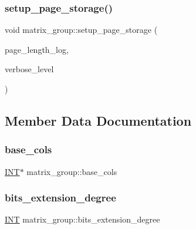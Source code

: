\subsubsection{\texorpdfstring{setup\+\_\+page\+\_\+storage()}{setup\_page\_storage()}}
{\footnotesize\ttfamily void matrix\+\_\+group\+::setup\+\_\+page\+\_\+storage (\begin{DoxyParamCaption}\item[{\mbox{\hyperlink{galois_8h_a09fddde158a3a20bd2dcadb609de11dc}{I\+NT}}}]{page\+\_\+length\+\_\+log,  }\item[{\mbox{\hyperlink{galois_8h_a09fddde158a3a20bd2dcadb609de11dc}{I\+NT}}}]{verbose\+\_\+level }\end{DoxyParamCaption})}



\subsection{Member Data Documentation}
\mbox{\label{classmatrix__group_a2b8d2ba90b5990ee7de25de2219f3097}} 
\subsubsection{\texorpdfstring{base\+\_\+cols}{base\_cols}}
{\footnotesize\ttfamily \mbox{\hyperlink{galois_8h_a09fddde158a3a20bd2dcadb609de11dc}{I\+NT}}$\ast$ matrix\+\_\+group\+::base\+\_\+cols}

\mbox{\label{classmatrix__group_ac9da8df618dc5b3184dce8d62416e8d8}} 
\subsubsection{\texorpdfstring{bits\+\_\+extension\+\_\+degree}{bits\_extension\_degree}}
{\footnotesize\ttfamily \mbox{\hyperlink{galois_8h_a09fddde158a3a20bd2dcadb609de11dc}{I\+NT}} matrix\+\_\+group\+::bits\+\_\+extension\+\_\+degree}

\mbox{\label{classmatrix__group_a8f7cab63148c716abdd0e019caaf5548}} 
